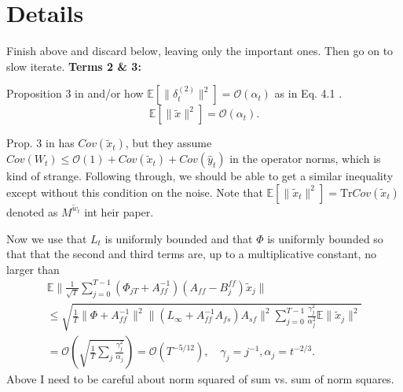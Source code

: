 \section{Details}\label{sec:details}

{\color{red}Finish above and discard below, leaving only the important ones.
Then go on to slow iterate.
}
\textbf{Terms 2 \& 3:}
\begin{lemma}
    Proposition 3 in \citep{kaledin2020finite} and/or how $\mathbb{E}[\lVert \delta_t^{(2)} \rVert^2] = \mathcal{O}(\alpha_t)$ as in Eq. 4.1 \citep{konda2004convergence}.
    \begin{equation}
        \mathbb{E}[\lVert \tilde{x} \rVert^2] = \mathcal{O}(\alpha_t) .
    \end{equation}    

    Prop. 3 in \citep{kaledin2020finite} has $Cov(\tilde{x}_t)$, but they assume $Cov(W_t) \leq \mathcal{O}(1) + Cov(\tilde{x}_t) + Cov(\hat{y}_t)$ in the operator norms, which is kind of strange.
    Following through, we should be able to get a similar inequality except without this condition on the noise. 
    Note that $\mathbb{E}[\lVert \tilde{x}_t \rVert^2] = \mathrm{Tr} Cov(\tilde{x}_t)$ denoted as $M^{\tilde{w}_t}$ int heir paper. 
\end{lemma}
Now we use that {\color{red}$L_t$ is uniformly bounded} and that {\color{red}$\Phi$ is uniformly bounded} so that that the second and third terms are, up to a multiplicative constant, no larger than
\begin{align*}
    \mathbb{E}\lVert \frac{1}{\sqrt{T}} \sum_{j=0}^{T-1} (\Phi_{jT} + A_{ff}^{-1})(A_{ff} - B_j^{ff}) \tilde{x}_j \rVert 
    \\ \leq 
    \sqrt{\frac{1}{T} \lVert \Phi + A_{ff}^{-1} \rVert^2 
    \lVert (L_\infty + A_{ff}^{-1}A_{fs})A_{sf} \rVert^2 \sum_{j=0}^{T-1} \frac{\gamma_j^2}{\alpha_j^2} \mathbb{E} \lVert \tilde{x}_j \rVert^2}
    \\ 
    = \mathcal{O}\left(\sqrt{\frac{1}{T} \sum_j \frac{\gamma_j^2}{\alpha_j}}\right) 
    = \mathcal{O} (T^{-5/12}) 
    , \quad \gamma_j = j^{-1}, \alpha_j = t^{-2/3}
    .
\end{align*}
{\color{red}Above I need to be careful about norm squared of sum vs. sum of norm squares.}

